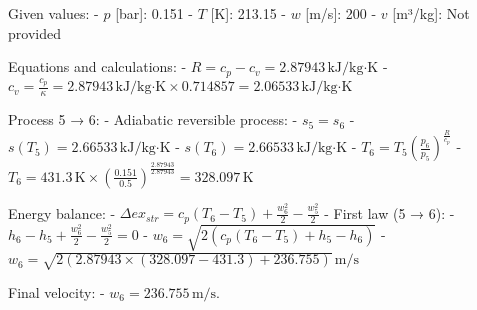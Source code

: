 Given values:  
- \( p \) [bar]: 0.151  
- \( T \) [K]: 213.15  
- \( w \) [m/s]: 200  
- \( v \) [m³/kg]: Not provided  

Equations and calculations:  
- \( R = c_p - c_v = 2.87943 \, \text{kJ/kg·K} \)  
- \( c_v = \frac{c_p}{\kappa} = 2.87943 \, \text{kJ/kg·K} \times 0.714857 = 2.06533 \, \text{kJ/kg·K} \)  

Process 5 → 6:  
- Adiabatic reversible process:  
  - \( s_5 = s_6 \)  
  - \( s(T_5) = 2.66533 \, \text{kJ/kg·K} \)  
  - \( s(T_6) = 2.66533 \, \text{kJ/kg·K} \)  
  - \( T_6 = T_5 \left( \frac{p_6}{p_5} \right)^{\frac{R}{c_p}} \)  
  - \( T_6 = 431.3 \, \text{K} \times \left( \frac{0.151}{0.5} \right)^{\frac{2.87943}{2.87943}} = 328.097 \, \text{K} \)  

Energy balance:  
- \( \Delta ex_{str} = c_p (T_6 - T_5) + \frac{w_6^2}{2} - \frac{w_5^2}{2} \)  
- First law (5 → 6):  
  - \( h_6 - h_5 + \frac{w_6^2}{2} - \frac{w_5^2}{2} = 0 \)  
  - \( w_6 = \sqrt{2 (c_p (T_6 - T_5) + h_5 - h_6)} \)  
  - \( w_6 = \sqrt{2 (2.87943 \times (328.097 - 431.3) + 236.755)} \, \text{m/s} \)  

Final velocity:  
- \( w_6 = 236.755 \, \text{m/s} \).